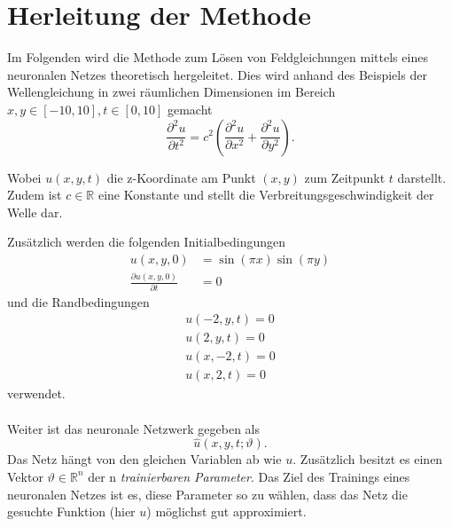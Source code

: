 %
%
%
%

\section{Herleitung der Methode\label{neuronal:section:herleitung}}

Im Folgenden wird die Methode zum Lösen von Feldgleichungen mittels eines neuronalen Netzes theoretisch hergeleitet.
Dies wird anhand des Beispiels der Wellengleichung in zwei räumlichen Dimensionen im Bereich \( x, y \in [-10,10], t \in [0,10] \) gemacht
\begin{equation}
    \frac{\partial^2 u}{\partial t^2} = c^2 \left( \frac{\partial^2 u}{\partial x^2} + \frac{\partial^2 u}{\partial y^2} \right).
    \label{neuronal:wellengleichung}
\end{equation}

Wobei \( u(x, y, t) \) die z-Koordinate am Punkt \( (x, y) \) zum Zeitpunkt \( t \) darstellt. 
Zudem ist \( c \in \mathbb{R} \) eine Konstante und stellt die Verbreitungsgeschwindigkeit der Welle dar.

Zusätzlich werden die folgenden Initialbedingungen
\begin{equation}
    \begin{aligned}
        u(x, y, 0) &= \sin(\pi x) \sin(\pi y)\\
        \frac{\partial u(x, y, 0)}{\partial t} &= 0
    \end{aligned}
    \label{neuronal:initial}
\end{equation}
und die Randbedingungen
\begin{equation}
    \begin{aligned}
        u(-2, y, t) = 0\\
        u(2, y, t) = 0\\
        u(x, -2, t) = 0\\
        u(x, 2, t) = 0
    \end{aligned}
    \label{neuronal:rand}
\end{equation}
verwendet.\\
\\
Weiter ist das neuronale Netzwerk gegeben als
\begin{equation}
    \hat{u}(x, y, t; \vartheta).
    \label{neuronal:nn}
\end{equation}
Das Netz hängt von den gleichen Variablen ab wie \( u \).
Zusätzlich besitzt es einen Vektor \( \vartheta \in \mathbb{R}^n \) der n \emph{trainierbaren Parameter}.
Das Ziel des Trainings eines neuronalen Netzes ist es, diese Parameter so zu wählen, dass das Netz die gesuchte Funktion (hier \( u \)) möglichst gut approximiert.


